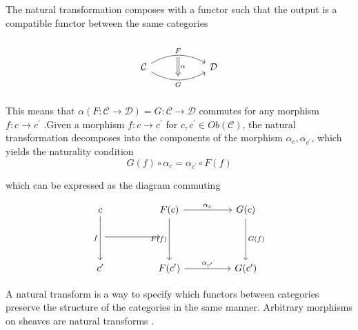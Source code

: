 \documentclass[10pt,journal,compsoc]{IEEEtran}
\theoremstyle{definition}
\theoremstyle{remark}
\begin{document}
The natural transformation composes with a functor such that the output is a compatible functor between the same categories 
\begin{equation}
  \label{eq:related-work:equivariance:natural-transform}
\begin{tikzcd}
  & {} \arrow[dd, "\alpha", Rightarrow, shorten=1.5em] &             \\
\mathcal{C} \arrow[rr, "F", bend left] \arrow[rr, "G"', bend right] &                                     & \mathcal{D} \\
  & {}                                  &            
\end{tikzcd}
\end{equation}
This means that $\alpha(F: \mathcal{C} \rightarrow \mathcal{D}) = G: \mathcal{C} \rightarrow \mathcal{D}$ commutes for any morphism $f:c\rightarrow c^{\prime}$ \cite{fongInvitationAppliedCategory2019}.Given a morphism $f: c\rightarrow c^{\prime}$ for $c, c^{\prime} \in Ob(\mathcal{C})$, the natural transformation decomposes into the components of the morphism $\alpha_{c}, \alpha_{c^{\prime}}$, which yields the naturality condition \cite{milewskiCategoryTheoryProgrammers} 
\begin{equation}
  \label{eq:related-work:equivariance:naturality-condition}
  G(f) \circ \alpha_{c} = \alpha_{c^\prime} \circ F(f)
\end{equation}

which can be expressed as the diagram commuting

\begin{equation}
  \label{eq:related-work:equivariance:natural-transform-components}
  \begin{tikzcd}
    c \arrow[dd, "f"'] &  & F(c) \arrow[dd, "F(f)"'] \arrow[rr, "\alpha_{c}"] &  & G(c) \arrow[dd, "G(f)"] \\
    {} \arrow[rr, shorten > = 5]      &  & {}                                                &  &                         \\
    c^{\prime}         &  & F(c^{\prime}) \arrow[rr, "\alpha_{c^{\prime}}"]   &  & G(c^{\prime})          
    \end{tikzcd}
\end{equation}




A natural transform is a way to specify which functors between categories preserve the structure of the categories in the same manner. Arbitrary morphisms on sheaves are natural transforms \cite{SheafMathematics2021,bradleyWhatNaturalTransformation}. 
\end{document}
